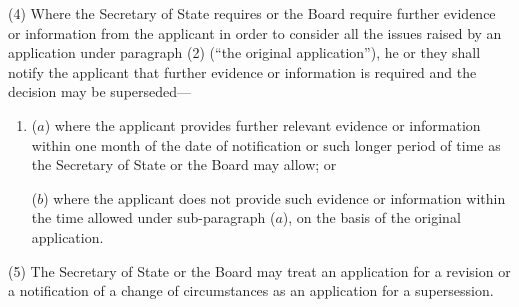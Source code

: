 \documentclass[12pt,a4paper]{article}
\begin{document}
\pagebreak[3]

(4) Where the Secretary of State requires 
or the Board require  %
further evidence or information from the applicant in order to consider all the issues raised by an application under paragraph (2) (“the original application”), he 
or they  %
shall notify the applicant that further evidence or information is required and the decision may be superseded—
\begin{enumerate}\item[]
($a$) where the applicant provides further relevant evidence or information within one month of the date of notification or such longer period of time as the Secretary of State 
or the Board  %
may allow; or

($b$) where the applicant does not provide such evidence or information within the time allowed under sub-paragraph ($a$), on the basis of the original application.
\end{enumerate}

(5) The Secretary of State 
or the Board  %
may treat an application for a revision or a notification of a change of circumstances as an application for a supersession.
\end{document}
